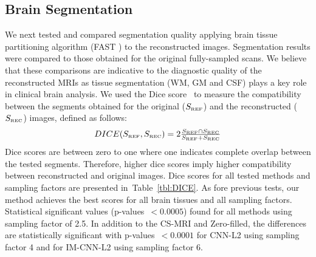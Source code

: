 \documentclass[review]{elsarticle}
\begin{document}
\subsection{Brain Segmentation}
We next tested and compared segmentation quality applying brain tissue partitioning algorithm (FAST \cite{zhang2001segmentation}) to the reconstructed images. Segmentation results were compared to those obtained for the original fully-sampled scans. We believe that these comparisons are indicative to the diagnostic quality of the reconstructed MRIs as tissue segmentation (WM, GM and CSF) plays a key role in clinical brain analysis.
We used the Dice score~\cite{dice1945measures} to measure the compatibility between the segments obtained for the original ($S_{\mbox{\tiny{REF}}}$) and the reconstructed ($S_{\mbox{\tiny{REC}}}$) images, defined as follows:
\begin{equation}
\begin{array}{c}
DICE(S_{\mbox{\tiny{REF}}}, S_{\mbox{\tiny{REC}}}) = 2\frac{S_{\mbox{\tiny{REF}}} \cap S_{\mbox{\tiny{REC}}}}{S_{\mbox{\tiny{REF}}} + S_{\mbox{\tiny{REC}}}}
\end{array}
\end{equation}
Dice scores are between zero to one where one indicates complete overlap between the tested segments. Therefore, higher dice scores imply higher compatibility between reconstructed and original images.
Dice scores for all tested methods and sampling factors are presented in~Table~\ref{tbl:DICE}. As fore previous tests, our method achieves the best scores for all brain tissues and all sampling factors. Statistical significant values (p-values~$<0.0005$) found for all methods using sampling factor of 2.5. In addition to the CS-MRI and Zero-filled, the differences are statistically significant with p-values~$<0.0001$ for CNN-L2 using sampling factor 4 and for IM-CNN-L2 using sampling factor 6.
\end{document}
